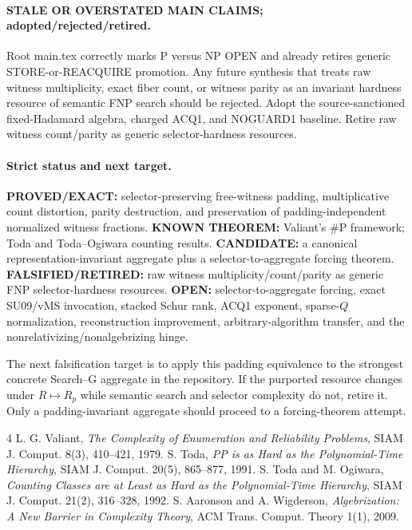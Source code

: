 \documentclass[11pt]{article}
\begin{document}
\paragraph{STALE OR OVERSTATED MAIN CLAIMS; adopted/rejected/retired.}
Root main.tex correctly marks P versus NP OPEN and already retires generic STORE-or-REACQUIRE promotion. Any future synthesis that treats raw witness multiplicity, exact fiber count, or witness parity as an invariant hardness resource of semantic FNP search should be rejected. Adopt the source-sanctioned fixed-Hadamard algebra, charged ACQ1, and NOGUARD1 baseline. Retire raw witness count/parity as generic selector-hardness resources.

\paragraph{Strict status and next target.}
\textbf{PROVED/EXACT:} selector-preserving free-witness padding, multiplicative count distortion, parity destruction, and preservation of padding-independent normalized witness fractions. \textbf{KNOWN THEOREM:} Valiant's \#P framework; Toda and Toda--Ogiwara counting results. \textbf{CANDIDATE:} a canonical representation-invariant aggregate plus a selector-to-aggregate forcing theorem. \textbf{FALSIFIED/RETIRED:} raw witness multiplicity/count/parity as generic FNP selector-hardness resources. \textbf{OPEN:} selector-to-aggregate forcing, exact SU09/vMS invocation, stacked Schur rank, ACQ1 exponent, sparse-$Q$ normalization, reconstruction improvement, arbitrary-algorithm transfer, and the nonrelativizing/nonalgebrizing hinge.

The next falsification target is to apply this padding equivalence to the strongest concrete Search--G aggregate in the repository. If the purported resource changes under $R\mapsto R_p$ while semantic search and selector complexity do not, retire it. Only a padding-invariant aggregate should proceed to a forcing-theorem attempt.

\begin{thebibliography}{4}
 L. G. Valiant, \emph{The Complexity of Enumeration and Reliability Problems}, SIAM J. Comput. 8(3), 410--421, 1979.
 S. Toda, \emph{PP is as Hard as the Polynomial-Time Hierarchy}, SIAM J. Comput. 20(5), 865--877, 1991.
 S. Toda and M. Ogiwara, \emph{Counting Classes are at Least as Hard as the Polynomial-Time Hierarchy}, SIAM J. Comput. 21(2), 316--328, 1992.
 S. Aaronson and A. Wigderson, \emph{Algebrization: A New Barrier in Complexity Theory}, ACM Trans. Comput. Theory 1(1), 2009.
\end{thebibliography}
\end{document}
